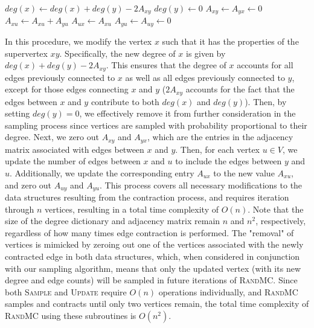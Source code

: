 \documentclass[12pt]{article}
\begin{document}
\begin{solution}
\begin{enumerate}[label=(\alph*)]
\begin{answerbox}
\begin{algorithmic}[1]
\State $deg(x) \gets deg(x) + deg(y) - 2A_{xy}$
\State $deg(y) \gets 0$
\State $A_{xy} \gets A_{yx} \gets 0$
\State $A_{xu} \gets A_{xu} + A_{yu}$
\State $A_{ux} \gets A_{xu}$
\State $A_{yu} \gets A_{uy} \gets 0$
\EndFor
\EndProcedure
\end{algorithmic}
\end{answerbox}
In this procedure, we modify the vertex $x$ such that it has the properties of the supervertex $xy$. Specifically, the new degree of $x$ is given by $deg(x) + deg(y) - 2A_{xy}$. This ensures that the degree of $x$ accounts for all edges previously connected to $x$ as well as all edges previously connected to $y$, except for those edges connecting $x$ and $y$ ($2A_{xy}$ accounts for the fact that the edges between $x$ and $y$ contribute to both $deg(x)$ and $deg(y)$). Then, by setting $deg(y) = 0$, we effectively remove it from further consideration in the sampling process since vertices are sampled with probability proportional to their degree. Next, we zero out $A_{xy}$ and $A_{yx}$, which are the entries in the adjacency matrix associated with edges between $x$ and $y$. Then, for each vertex $u \in V$, we update the number of edges between $x$ and $u$ to include the edges between $y$ and $u$. Additionally, we update the corresponding entry $A_{ux}$ to the new value $A_{xu}$, and zero out $A_{uy}$ and $A_{yu}$. This process covers all necessary modifications to the data structures resulting from the contraction process, and requires iteration through $n$ vertices, resulting in a total time complexity of $O(n)$. Note that the size of the degree dictionary and adjacency matrix remain $n$ and $n^2$, respectively, regardless of how many times edge contraction is performed. The "removal" of vertices is mimicked by zeroing out one of the vertices associated with the newly contracted edge in both data structures, which, when considered in conjunction with our sampling algorithm, means that only the updated vertex (with its new degree and edge counts) will be sampled in future iterations of \textsc{RandMC}. Since both \textsc{Sample} and \textsc{Update} require $O(n)$ operations individually, and \textsc{RandMC} samples and contracts until only two vertices remain, the total time complexity of \textsc{RandMC} using these subroutines is $O(n^2)$.
\end{enumerate}

\end{solution}
\end{document}

